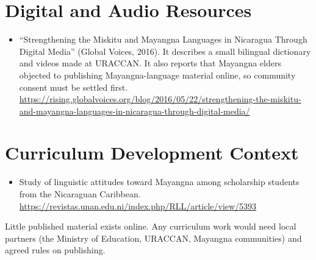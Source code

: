 \documentclass[12pt]{article}
\begin{document}
\section{Digital and Audio Resources}
\begin{itemize}
\item ``Strengthening the Miskitu and Mayangna Languages in Nicaragua Through Digital Media'' (Global Voices, 2016). It describes a small bilingual dictionary and videos made at URACCAN. It also reports that Mayangna elders objected to publishing Mayangna-language material online, so community consent must be settled first. \url{https://rising.globalvoices.org/blog/2016/05/22/strengthening-the-miskitu-and-mayangna-languages-in-nicaragua-through-digital-media/}
\end{itemize}

\section{Curriculum Development Context}
\begin{itemize}
\item Study of linguistic attitudes toward Mayangna among scholarship students from the Nicaraguan Caribbean. \url{https://revistas.unan.edu.ni/index.php/RLL/article/view/5393}
\end{itemize}
Little published material exists online. Any curriculum work would need local partners (the Ministry of Education, URACCAN, Mayangna communities) and agreed rules on publishing.
\end{document}

